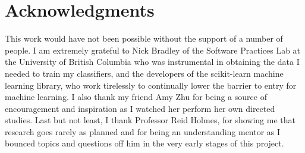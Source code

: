 \documentclass[sigchi]{acmart}
\begin{document}
\section{Acknowledgments}
This work would have not been possible without the support of a number of people. I am extremely grateful to Nick Bradley of the Software Practices Lab at the University of British Columbia who was instrumental in obtaining the data I needed to train my classifiers, and the developers of the scikit-learn machine learning library, who work tirelessly to continually lower the barrier to entry for machine learning. I also thank my friend Amy Zhu for being a source of encouragement and inspiration as I watched her perform her own directed studies. Last but not least, I thank Professor Reid Holmes, for showing me that research goes rarely as planned and for being an understanding mentor as I bounced topics and questions off him in the very early stages of this project.




\end{document}
